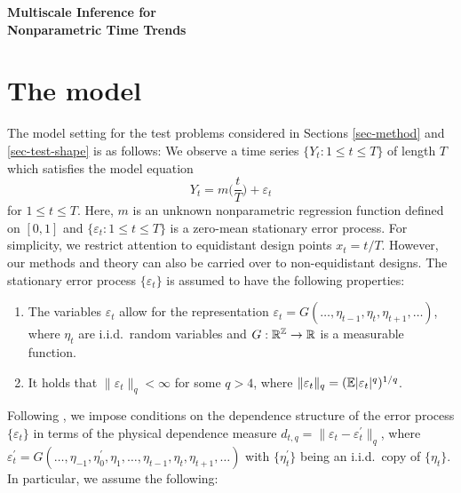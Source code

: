 \documentclass[a4paper,12pt]{article}
\numberwithin{equation}{section}
\begin{document}
\begin{center}
{\LARGE \textbf{Multiscale Inference for}} \\[0.35cm]
{\LARGE \textbf{Nonparametric Time Trends}}
\end{center}



\section{The model}\label{sec-model}


The model setting for the test problems considered in Sections \ref{sec-method} and \ref{sec-test-shape} is as follows: We observe a time series $\{Y_t: 1 \le t \le T \}$ of length $T$ which satisfies the model equation 
\begin{equation}\label{model1}
Y_t = m \Big( \frac{t}{T} \Big) + \varepsilon_t 
\end{equation}
for $1 \le t \le T$. Here, $m$ is an unknown nonparametric regression function defined on $[0,1]$ and $\{ \varepsilon_t: 1 \le t \le T \}$ is a zero-mean stationary error process. For simplicity, we restrict attention to equidistant design points $x_t = t/T$. However, our methods and theory can also be carried over to non-equidistant designs. The stationary error process $\{\varepsilon_t\}$ is assumed to have the following properties: 
\begin{enumerate}[label=(C\arabic*),leftmargin=1.05cm]

\item \label{C-err1} The variables $\varepsilon_t$ allow for the representation $\varepsilon_t = G(\ldots,\eta_{t-1},\eta_t,\eta_{t+1},\ldots)$, where $\eta_t$ are i.i.d.\ random variables and $G: \mathbb{R}^{\mathbb{Z}} \rightarrow \mathbb{R}$ is a measurable function. 

\item \label{C-err2} It holds that $\| \varepsilon_t \|_q < \infty$ for some $q > 4$, where $\| \varepsilon_t \|_q = (\mathbb{E}|\varepsilon_t|^q)^{1/q}$. 

\end{enumerate}
Following \cite{Wu2005}, we impose conditions on the dependence structure of the error process $\{\varepsilon_t\}$ in terms of the physical dependence measure $d_{t,q} = \| \varepsilon_t - \varepsilon_t^\prime \|_q$, where $\varepsilon_t^\prime = G(\ldots,\eta_{-1},\eta_0^\prime,\eta_1,\ldots,\eta_{t-1},\eta_t,\eta_{t+1},\ldots)$ with $\{\eta_t^\prime\}$ being an i.i.d.\ copy of $\{\eta_t\}$. In particular, we assume the following: 
\end{document}
